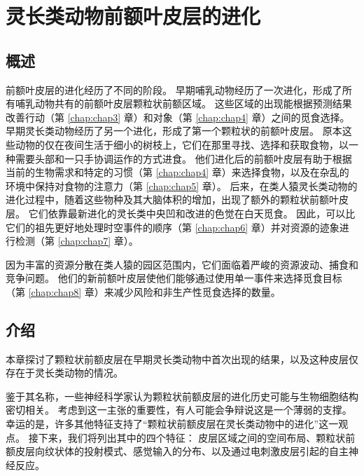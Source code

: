 \chapter{灵长类动物前额叶皮层的进化} \label{chap:chap2}


\section{概述}
前额叶皮层的进化经历了不同的阶段。
早期哺乳动物经历了一次进化，形成了所有哺乳动物共有的前额叶皮层颗粒状前额区域。
这些区域的出现能根据预测结果改善行动（第 \ref{chap:chap3} 章）和对象（第 \ref{chap:chap4} 章）之间的觅食选择。
早期灵长类动物经历了另一个进化，形成了第一个颗粒状的前额叶皮层。
原本这些动物的仅在夜间生活于细小的树枝上，它们在那里寻找、选择和获取食物，以一种需要头部和一只手协调运作的方式进食。
他们进化后的前额叶皮层有助于根据当前的生物需求和特定的习惯（第 \ref{chap:chap4} 章）来选择食物，以及在杂乱的环境中保持对食物的注意力（第 \ref{chap:chap5} 章）。
后来，在类人猿灵长类动物的进化过程中，随着这些物种及其大脑体积的增加，出现了额外的颗粒状前额叶皮层。
它们依靠最新进化的灵长类中央凹和改进的色觉在白天觅食。
因此，可以比它们的祖先更好地处理时空事件的顺序（第 \ref{chap:chap6} 章）并对资源的迹象进行检测（第 \ref{chap:chap7} 章）。\begin{flushright}
\end{flushright}
因为丰富的资源分散在类人猿的园区范围内，它们面临着严峻的资源波动、捕食和竞争问题。
他们的新前额叶皮层使他们能够通过使用单一事件来选择觅食目标（第 \ref{chap:chap8} 章）来减少风险和非生产性觅食选择的数量。









\section{介绍}

本章探讨了颗粒状前额皮层在早期灵长类动物中首次出现的结果，以及这种皮层仅存在于灵长类动物的情况\cite{preuss2007evolutionary}。


鉴于其名称，一些神经科学家认为颗粒状前额皮层的进化历史可能与生物细胞结构密切相关。
考虑到这一主张的重要性，有人可能会争辩说这是一个薄弱的支撑。
幸运的是，许多其他特征支持了“颗粒状前额皮层在灵长类动物中的进化”这一观点。
接下来，我们将列出其中的四个特征：
皮层区域之间的空间布局、颗粒状前额皮层向纹状体的投射模式、感觉输入的分布、以及通过电刺激皮层引起的自主神经反应。





